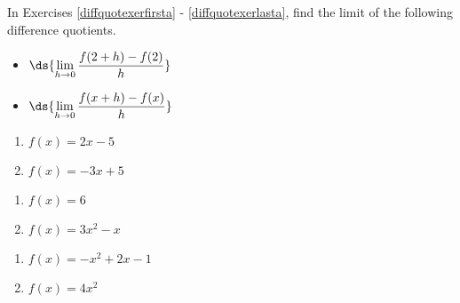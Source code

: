 \documentclass{ximera}
\begin{document}
	\author{Stitz-Zeager}



\label{ExercisesforAppDerivatives}
In Exercises \ref{diffquotexerfirsta} - \ref{diffquotexerlasta}, find the limit of the following difference quotients.

\begin{multicols}{2}

\begin{itemize}

\item  $\ds{\lim_{h \rightarrow 0} \dfrac{f(2+h) - f(2)}{h}}$

\item  $\ds{\lim_{h \rightarrow 0} \dfrac{f(x+h) - f(x)}{h}}$

\end{itemize}

\end{multicols}


\begin{multicols}{2}

\begin{enumerate}


\item $f(x) = 2x - 5$ \label{diffquotexerfirsta}
\item $f(x) = -3x + 5$

\setcounter{HW}{\value{enumi}}
\end{enumerate}
\end{multicols}

\begin{multicols}{2}
\begin{enumerate}
\setcounter{enumi}{\value{HW}}

\item $f(x) = 6$
\item $f(x) = 3x^2 - x$

\setcounter{HW}{\value{enumi}}
\end{enumerate}
\end{multicols}

\begin{multicols}{2}
\begin{enumerate}
\setcounter{enumi}{\value{HW}}

\item $f(x) = -x^2 + 2x - 1$
\item\label{diffquotexerlasta}  $f(x) = 4x^2$ 

\setcounter{HW}{\value{enumi}}
\end{enumerate}
\end{multicols}
\end{document}
